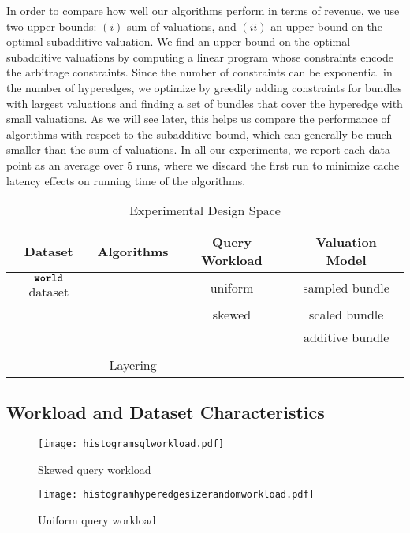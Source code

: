 In order to compare how well our algorithms perform in terms of revenue, we use two upper 
bounds: $(i)$ sum of valuations, and $(ii)$ an upper bound on the optimal subadditive valuation. We find an upper bound on the optimal subadditive valuations by computing a linear program whose constraints encode the arbitrage constraints. Since the number of constraints can be exponential in the number of hyperedges, we optimize by greedily adding constraints for bundles with largest valuations and finding a set of bundles that cover the hyperedge with small valuations. As we will see later, this helps us compare the performance of algorithms with respect to the subadditive bound, which can
generally be much smaller than the sum of valuations. 
In all our experiments, we report each data point as an average over $5$ runs, where we discard the first run to minimize cache latency effects on running time of the algorithms.

\begin{table*} \centering
	\def\arraystretch{1.35}%
	\begin{tabular}{c|c|c|c}
		\toprule
		\textbf{Dataset} & \textbf{Algorithms} & \textbf{Query Workload} & \textbf{Valuation Model}\\ \midrule
		$\texttt{\bfseries world}$ dataset & \ubp & uniform & sampled bundle  \\ 
		& \uip & skewed & scaled bundle  \\ 
		& \lpip &  & additive bundle  \\ 
		& \cip & &  \\
		& Layering &  &  \\
		\bottomrule
	\end{tabular}
	\caption{Experimental Design Space}
	\label{table:experiments}
\end{table*}

\subsection{Workload and Dataset Characteristics}

\begin{figure}[!h]
	\begin{minipage}[t]{0.49\linewidth} 
		\centering
		\texttt{[image: histogramsqlworkload.pdf]}
		\caption{Skewed query workload} \label{fig:histogramrealqueries}
	\end{minipage}       	
	\begin{minipage}[t]{0.47\linewidth}
		\centering
		\texttt{[image: histogramhyperedgesizerandomworkload.pdf]}
		\caption{Uniform query workload} \label{fig:histogramrandom}
	\end{minipage} 
\end{figure}  



